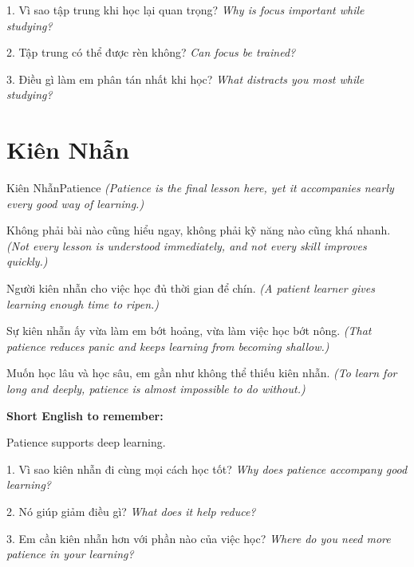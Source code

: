 \begin{tuhocnhanh}
1. Vì sao tập trung khi học lại quan trọng? \textit{Why is focus important while studying?}

2. Tập trung có thể được rèn không? \textit{Can focus be trained?}

3. Điều gì làm em phân tán nhất khi học? \textit{What distracts you most while studying?}
\end{tuhocnhanh}
\ngancach

\section{Kiên Nhẫn}
\begin{truyen}{Kiên Nhẫn}{Patience}
\textit{(Patience is the final lesson here, yet it accompanies nearly every good way of learning.)}

Không phải bài nào cũng hiểu ngay, không phải kỹ năng nào cũng khá nhanh.
\textit{(Not every lesson is understood immediately, and not every skill improves quickly.)}

Người kiên nhẫn cho việc học đủ thời gian để chín.
\textit{(A patient learner gives learning enough time to ripen.)}

Sự kiên nhẫn ấy vừa làm em bớt hoảng, vừa làm việc học bớt nông.
\textit{(That patience reduces panic and keeps learning from becoming shallow.)}
\end{truyen}

\begin{baihoc}
Muốn học lâu và học sâu, em gần như không thể thiếu kiên nhẫn.
\textit{(To learn for long and deeply, patience is almost impossible to do without.)}
\end{baihoc}

\begin{ghinhoanh}
\textbf{Short English to remember:}

Patience supports deep learning.

\end{ghinhoanh}

\begin{tuhocnhanh}
1. Vì sao kiên nhẫn đi cùng mọi cách học tốt? \textit{Why does patience accompany good learning?}

2. Nó giúp giảm điều gì? \textit{What does it help reduce?}

3. Em cần kiên nhẫn hơn với phần nào của việc học? \textit{Where do you need more patience in your learning?}
\end{tuhocnhanh}
\ngancach